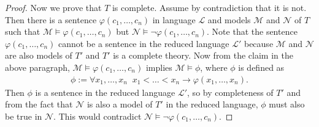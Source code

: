 \documentclass{article}
\begin{document}
\begin{enumerate}[label={\bf Q\arabic*:}]
\begin{enumerate}
\begin{proof}
          Now we prove that $T$ is complete. Assume by contradiction that
          it is not. Then there is a sentence $\varphi(c_1,\ldots,c_n)$ in
          language $\mathcal{L}$ and models $\mathcal{M}$ and $\mathcal{N}$
          of $T$ such that $\mathcal{M}\models\varphi(c_1,\ldots,c_n)$ but
          $\mathcal{N}\models\neg\varphi(c_1,\ldots,c_n)$. Note that the
          sentence $\varphi(c_1,\ldots,c_n)$ cannot be a sentence in the
          reduced language $\mathcal{L}'$ because $\mathcal{M}$ and
          $\mathcal{N}$ are also models of $T'$ and $T'$ is a complete
          theory. Now from the claim in the above paragraph,
          $\mathcal{M}\models\varphi(c_1,\ldots,c_n)$ implies
          $\mathcal{M}\models\phi$, where $\phi$ is defined as
          \begin{align*}
            \phi:= \forall x_1,\ldots,x_n\;\;
              x_1<\ldots<x_n\rightarrow\varphi(x_1,\ldots,x_n).
          \end{align*}
          Then $\phi$ is a sentence in the reduced language $\mathcal{L}'$,
          so by completeness of $T'$ and from the fact that $\mathcal{N}$
          is also a model of $T'$ in the reduced language, $\phi$ must also
          be true in $\mathcal{N}$. This would contradict
          $\mathcal{N}\models\neg\varphi(c_1,\ldots,c_n)$.
        \end{proof}
    \end{enumerate}
\end{enumerate}
\end{document}
